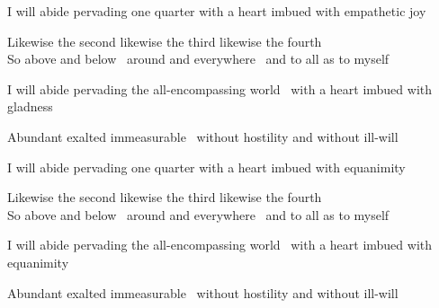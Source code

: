 \medskip

\begin{english-hang}
  I will abide pervading one quarter with a heart imbued with empathetic joy\makeatletter\hyperlink{endnote97-appendix}\makeatother
\end{english-hang}

\begin{english}
  Likewise the second likewise the third likewise the fourth\\
  So above and below \breathmark\ around and everywhere \breathmark\ and to all as to myself
\end{english}

\begin{english-hang}
  I will abide pervading the all-encompassing world \breathmark\ with a heart imbued with gladness
\end{english-hang}

\begin{english-hang}
  Abundant exalted immeasurable \breathmark\ without hostility and without ill-will
\end{english-hang}

\smallskip

\begin{english-hang}
  I will abide pervading one quarter with a heart imbued with equanimity
\end{english-hang}

\begin{english}
  Likewise the second likewise the third likewise the fourth\\
  So above and below \breathmark\ around and everywhere \breathmark\ and to all as to myself
\end{english}

\begin{english-hang}
  I will abide pervading the all-encompassing world \breathmark\ with a heart imbued with equanimity
\end{english-hang}

\begin{english-hang}
  Abundant exalted immeasurable \breathmark\ without hostility and without ill-will
\end{english-hang}

\suttaRef{[DN 13]}


